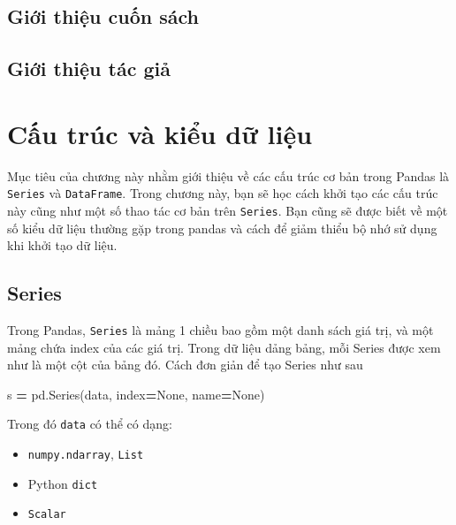 \documentclass[
]{book}
\newenvironment{Shaded}{\begin{snugshade}}{\end{snugshade}}
\newcommand{\NormalTok}[1]{#1}
\newcommand{\OperatorTok}[1]{\textcolor[rgb]{0.81,0.36,0.00}{\textbf{#1}}}
\newcommand{\VariableTok}[1]{\textcolor[rgb]{0.00,0.00,0.00}{#1}}
\begin{document}
\section*{Giới thiệu cuốn sách}\label{giux1edbi-thiux1ec7u-cuux1ed1n-suxe1ch}


\section*{Giới thiệu tác giả}\label{giux1edbi-thiux1ec7u-tuxe1c-giux1ea3}


\chapter{Cấu trúc và kiểu dữ liệu}\label{cux1ea5u-truxfac-vuxe0-kiux1ec3u-dux1eef-liux1ec7u}

Mục tiêu của chương này nhằm giới thiệu về các cấu trúc cơ bản trong Pandas là \texttt{Series} và \texttt{DataFrame}.
Trong chương này, bạn sẽ học cách khởi tạo các cấu trúc này cũng như một số thao tác cơ bản trên \texttt{Series}.
Bạn cũng sẽ được biết về một số kiểu dữ liệu thường gặp trong pandas và cách để giảm thiểu bộ nhớ sử dụng khi khởi tạo dữ liệu.

\section{Series}\label{series}

Trong Pandas, \texttt{Series} là mảng 1 chiều bao gồm một danh sách giá trị, và một mảng chứa index
của các giá trị. Trong dữ liệu dảng bảng, mỗi Series được xem như là một cột của bảng đó.
Cách đơn giản để tạo Series như sau

\begin{Shaded}
\begin{Highlighting}[]
\NormalTok{s }\OperatorTok{=}\NormalTok{ pd.Series(data, index}\OperatorTok{=}\VariableTok{None}\NormalTok{, name}\OperatorTok{=}\VariableTok{None}\NormalTok{)}
\end{Highlighting}
\end{Shaded}

Trong đó \texttt{data} có thể có dạng:

\begin{itemize}
\item
  \texttt{numpy.ndarray}, \texttt{List}
\item
  Python \texttt{dict}
\item
  \texttt{Scalar}
\end{itemize}
\end{document}
